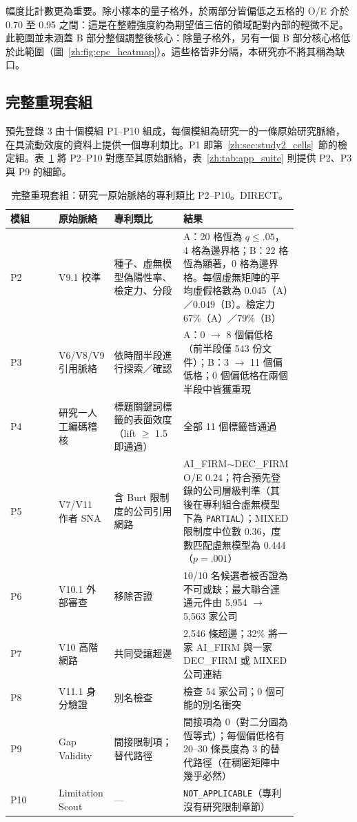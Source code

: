 幅度比計數更為重要。除小樣本的量子格外，於兩部分皆偏低之五格的 O/E 介於 0.70 至 0.95 之間：這是在整體強度約為期望值三倍的領域配對內部的輕微不足。此範圍並未涵蓋 B 部分整個調整後核心：除量子格外，另有一個 B 部分核心格低於此範圍（圖~\ref{zh:fig:cpc_heatmap}）。這些格皆非分隔，本研究亦不將其稱為缺口。

\subsection{完整重現套組}
\label{zh:sec:study2_suite}

預先登錄 3 由十個模組 P1--P10 組成，每個模組為研究一的一條原始研究脈絡，在具流動效度的資料上提供一個專利類比。P1 即第~\ref{zh:sec:study2_cells}~節的檢定組。表~\ref{zh:tab:suite} 將 P2--P10 對應至其原始脈絡，表~\ref{zh:tab:app_suite} 則提供 P2、P3 與 P9 的細節。

\begin{table}[tbp]
  \centering
  \small
  \caption{完整重現套組：研究一原始脈絡的專利類比 P2--P10。DIRECT。}
  \label{zh:tab:suite}
  \setlength{\tabcolsep}{4pt}
  \begin{tabular}{l p{0.19\linewidth} p{0.24\linewidth} p{0.40\linewidth}}
    \toprule
    模組 & 原始脈絡 & 專利類比 & 結果 \\
    \midrule
    P2 & V9.1 校準 & 種子、虛無模型偽陽性率、檢定力、分段 & A：20 格恆為 $q \le .05$，4 格為邊界格；B：22 格恆為顯著，0 格為邊界格。每個虛無矩陣的平均虛假格數為 0.045（A）／0.049（B）。檢定力 67\%（A）／79\%（B） \\
    P3 & V6/V8/V9 引用脈絡 & 依時間半段進行探索／確認 & A：0 $\rightarrow$ 8 個偏低格（前半段僅 543 份文件）；B：3 $\rightarrow$ 11 個偏低格；0 個偏低格在兩個半段中皆獲重現 \\
    P4 & 研究一人工編碼稽核 & 標題關鍵詞標籤的表面效度（lift $\ge$ 1.5 即通過） & 全部 11 個標籤皆通過 \\
    P5 & V7/V11 作者 SNA & 含 Burt 限制度的公司引用網路 & AI\_FIRM$\sim$DEC\_FIRM O/E 0.24；符合預先登錄的公司層級判準（其後在專利組合虛無模型下為 \texttt{PARTIAL}）；MIXED 限制度中位數 0.36，度數匹配虛無模型為 0.444（$p = .001$） \\
    P6 & V10.1 外部審查 & 移除否證 & 10/10 名候選者被否證為不可或缺；最大聯合連通元件由 5,954 $\rightarrow$ 5,563 家公司 \\
    P7 & V10 高階網路 & 共同受讓超邊 & 2,546 條超邊；32\% 將一家 AI\_FIRM 與一家 DEC\_FIRM 或 MIXED 公司連結 \\
    P8 & V11.1 身分驗證 & 別名檢查 & 檢查 54 家公司；0 個可能的別名衝突 \\
    P9 & Gap Validity & 間接限制項；替代路徑 & 間接項為 0（對二分圖為恆等式）；每個偏低格有 20--30 條長度為 3 的替代路徑（在稠密矩陣中幾乎必然） \\
    P10 & Limitation Scout & --- & \texttt{NOT\_\allowbreak APPLICABLE}（專利沒有研究限制章節） \\
    \bottomrule
  \end{tabular}
\end{table}

